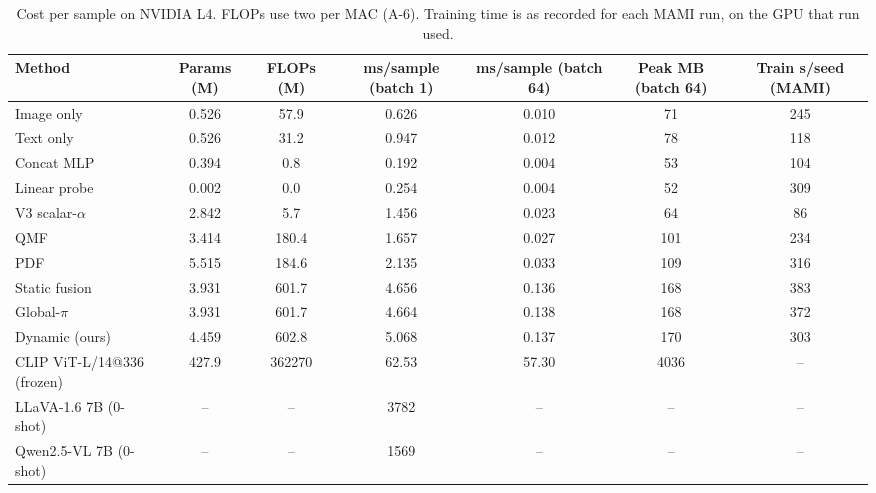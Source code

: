 \begin{table}[t]
\centering
\caption{Cost per sample on NVIDIA L4. FLOPs use two per MAC (A-6). Training time is as recorded for each MAMI run, on the GPU that run used.}
\label{tab:cost}
\begin{tabular}{lcccccc}
\toprule
Method & Params (M) & FLOPs (M) & ms/sample (batch 1) & ms/sample (batch 64) & Peak MB (batch 64) & Train s/seed (MAMI) \\
\midrule
Image only & 0.526 & 57.9 & 0.626 & 0.010 & 71 & 245 \\
Text only & 0.526 & 31.2 & 0.947 & 0.012 & 78 & 118 \\
Concat MLP & 0.394 & 0.8 & 0.192 & 0.004 & 53 & 104 \\
Linear probe & 0.002 & 0.0 & 0.254 & 0.004 & 52 & 309 \\
V3 scalar-$\alpha$ & 2.842 & 5.7 & 1.456 & 0.023 & 64 & 86 \\
QMF & 3.414 & 180.4 & 1.657 & 0.027 & 101 & 234 \\
PDF & 5.515 & 184.6 & 2.135 & 0.033 & 109 & 316 \\
Static fusion & 3.931 & 601.7 & 4.656 & 0.136 & 168 & 383 \\
Global-$\pi$ & 3.931 & 601.7 & 4.664 & 0.138 & 168 & 372 \\
Dynamic (ours) & 4.459 & 602.8 & 5.068 & 0.137 & 170 & 303 \\
CLIP ViT-L/14@336 (frozen) & 427.9 & 362270 & 62.53 & 57.30 & 4036 & – \\
LLaVA-1.6 7B (0-shot) & – & – & 3782 & – & – & – \\
Qwen2.5-VL 7B (0-shot) & – & – & 1569 & – & – & – \\
\bottomrule
\end{tabular}
\end{table}
